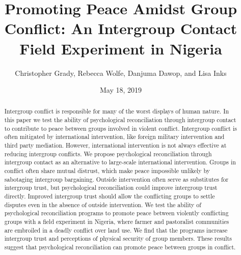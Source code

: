 \documentclass[11pt]{article}
\title{Promoting Peace Amidst Group Conflict: An Intergroup Contact Field
Experiment in Nigeria}
\author{
Christopher Grady, Rebecca Wolfe, Danjuma Dawop, and Lisa Inks
}
\date{May 18, 2019}
\begin{document}
\VerbatimFootnotes

%
%
%
%
%
%
%
%
%
%

\maketitle

\begin{abstract}

Intergroup conflict is responsible for many of the worst displays of human nature.  In this paper we test the ability of psychological reconciliation through intergroup contact to contribute to peace between groups involved in violent conflict.  Intergroup conflict is often mitigated by international intervention, like foreign military intervention and third party mediation.  However, international intervention is not always effective at reducing intergroup conflicts.  We propose psychological reconciliation through intergroup contact as an alternative to large-scale international intervention.  Groups in conflict often share mutual distrust, which make peace impossible unlikely by sabotaging intergroup bargaining.  Outside intervention often serve as substitutes for intergroup trust, but psychological reconciliation could improve intergroup trust directly.  Improved intergroup trust should allow the conflicting groups to settle disputes even in the absence of outside intervention.  We test the ability of psychological reconciliation programs to promote peace between violently conflicting groups with a field experiment in Nigeria, where farmer and pastoralist communities are embroiled in a deadly conflict over land use.  We find that the programs increase intergroup trust and perceptions of physical security of group members.  These results suggest that psychological reconciliation can promote peace between groups in conflict.

\end{abstract}
\end{document}
